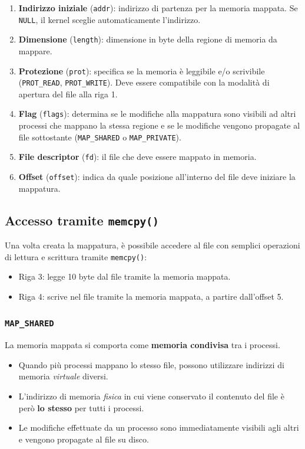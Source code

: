 \documentclass{article}
\begin{document}
\begin{enumerate}
    \item \textbf{Indirizzo iniziale} (\texttt{addr}): indirizzo di partenza per la memoria mappata. Se \texttt{NULL}, il kernel sceglie automaticamente l'indirizzo.
    \item \textbf{Dimensione} (\texttt{length}): dimensione in byte della regione di memoria da mappare.
    \item \textbf{Protezione} (\texttt{prot}): specifica se la memoria è leggibile e/o scrivibile (\texttt{PROT\_READ}, \texttt{PROT\_WRITE}). Deve essere compatibile con la modalità di apertura del file alla riga 1.
    \item \textbf{Flag} (\texttt{flags}): determina se le modifiche alla mappatura sono visibili ad altri processi che mappano la stessa regione e se le modifiche vengono propagate al file sottostante (\texttt{MAP\_SHARED} o \texttt{MAP\_PRIVATE}).
    \item \textbf{File descriptor} (\texttt{fd}): il file che deve essere mappato in memoria.
    \item \textbf{Offset} (\texttt{offset}): indica da quale posizione all'interno del file deve iniziare la mappatura.
\end{enumerate}

\subsection*{Accesso tramite \texttt{memcpy()}}

Una volta creata la mappatura, è possibile accedere al file con semplici operazioni di lettura e scrittura tramite \texttt{memcpy()}:
\begin{itemize}
    \item Riga 3: legge 10 byte dal file tramite la memoria mappata.
    \item Riga 4: scrive nel file tramite la memoria mappata, a partire dall'offset 5.
\end{itemize}


\subsubsection*{\texttt{MAP\_SHARED}}

La memoria mappata si comporta come \textbf{memoria condivisa} tra i processi.

\begin{itemize}
    \item Quando più processi mappano lo stesso file, possono utilizzare indirizzi di memoria \emph{virtuale} diversi.
    \item L'indirizzo di memoria \emph{fisica} in cui viene conservato il contenuto del file è però \textbf{lo stesso} per tutti i processi.
    \item Le modifiche effettuate da un processo sono immediatamente visibili agli altri e vengono propagate al file su disco.
\end{itemize}
\end{document}
